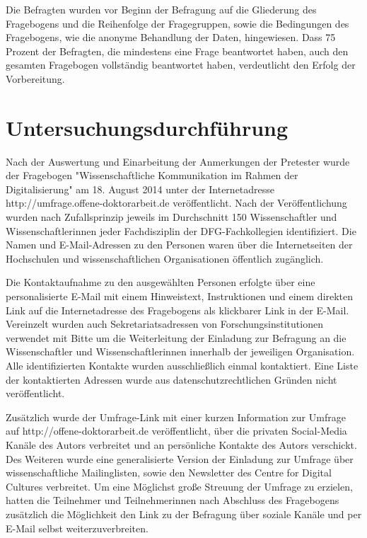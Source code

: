 Die Befragten wurden vor Beginn der Befragung auf die Gliederung des Fragebogens und die Reihenfolge der Fragegruppen, sowie die Bedingungen des Fragebogens, wie die anonyme Behandlung der Daten, hingewiesen. Dass 75 Prozent der Befragten, die mindestens eine Frage beantwortet haben, auch den gesamten Fragebogen vollständig beantwortet haben, verdeutlicht den Erfolg der Vorbereitung.

\section{Untersuchungsdurchführung}

Nach der Auswertung und Einarbeitung der Anmerkungen der Pretester wurde der Fragebogen "Wissenschaftliche Kommunikation im Rahmen der Digitalisierung" am 18. August 2014 unter der Internetadresse http://umfrage.offene-doktorarbeit.de veröffentlicht. Nach der Veröffentlichung wurden nach Zufallsprinzip jeweils im Durchschnitt 150 Wissenschaftler und Wissenschaftlerinnen jeder Fachdisziplin der DFG-Fachkollegien \cite{DFG_2014} identifiziert. Die Namen und E-Mail-Adressen zu den Personen waren über die Internetseiten der Hochschulen und wissenschaftlichen Organisationen öffentlich zugänglich.

Die Kontaktaufnahme zu den ausgewählten Personen erfolgte über eine personalisierte E-Mail mit einem Hinweistext, Instruktionen und einem direkten Link auf die Internetadresse des Fragebogens als klickbarer Link in der E-Mail. Vereinzelt wurden auch Sekretariatsadressen von Forschungsinstitutionen verwendet mit Bitte um die Weiterleitung der Einladung zur Befragung an die Wissenschaftler und Wissenschaftlerinnen innerhalb der jeweiligen Organisation. Alle identifizierten Kontakte wurden ausschließlich einmal kontaktiert. Eine Liste der kontaktierten Adressen wurde aus datenschutzrechtlichen Gründen nicht veröffentlicht.

Zusätzlich wurde der Umfrage-Link mit einer kurzen Information zur Umfrage auf http://offene-doktorarbeit.de veröffentlicht, über die privaten Social-Media Kanäle des Autors verbreitet und an persönliche Kontakte des Autors verschickt. Des Weiteren wurde eine generalisierte Version der Einladung zur Umfrage über wissenschaftliche Mailinglisten, sowie den Newsletter des Centre for Digital Cultures verbreitet. Um eine Möglichst große Streuung der Umfrage zu erzielen, hatten die Teilnehmer und Teilnehmerinnen nach Abschluss des Fragebogens zusätzlich die Möglichkeit den Link zu der Befragung über soziale Kanäle und per E-Mail selbst weiterzuverbreiten.

